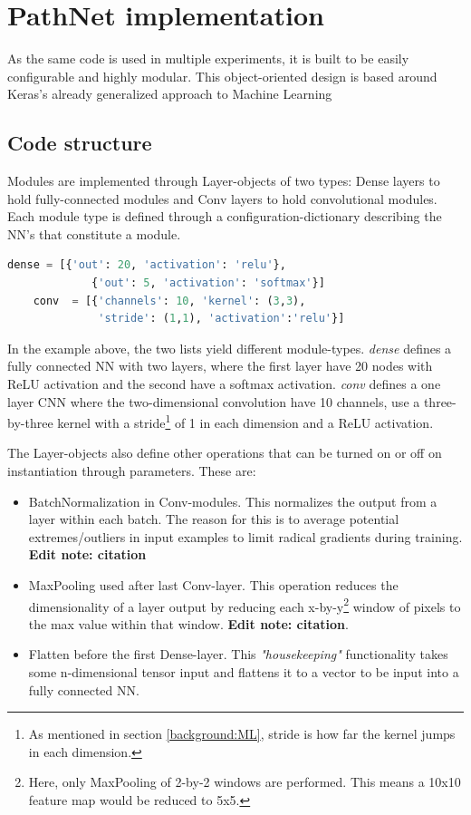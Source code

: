 \section{PathNet implementation}
As the same code is used in multiple experiments, it is built to be easily configurable and highly modular. This object-oriented design is based around Keras's already generalized approach to Machine Learning

\subsection{Code structure}
Modules are implemented through Layer-objects of two types: Dense layers to hold fully-connected modules and Conv layers to hold convolutional modules. Each module type is defined through a configuration-dictionary  describing the NN's that constitute a module. 

\begin{lstlisting}[language=Python]
    dense = [{'out': 20, 'activation': 'relu'}, 
             {'out': 5, 'activation': 'softmax'}]
    conv  = [{'channels': 10, 'kernel': (3,3), 
              'stride': (1,1), 'activation':'relu'}]
\end{lstlisting}
In the example above, the two lists yield different module-types. \textit{dense} defines a fully connected NN with two layers, where the first layer have 20 nodes with ReLU activation and the second have a softmax activation. \textit{conv} defines a one layer CNN where the two-dimensional convolution have 10 channels, use a three-by-three kernel with a stride\footnote{As mentioned in section \ref{background:ML}, stride is how far the kernel jumps in each dimension.} of 1 in each dimension and a ReLU activation.

The Layer-objects also define other operations that can be turned on or off on instantiation through parameters. These are:
\begin{itemize}
    \item BatchNormalization in Conv-modules. This normalizes the output from a layer within each batch. The reason for this is to average potential extremes/outliers in input examples to limit radical gradients during training. \textbf{Edit note: citation}
    \item MaxPooling used after last Conv-layer. This operation reduces the dimensionality of a layer output by reducing each x-by-y\footnote{Here, only MaxPooling of 2-by-2 windows are performed. This means a 10x10 feature map would be reduced to 5x5.} window of pixels to the max value within that window. \textbf{Edit note: citation}.
    \item Flatten before the first Dense-layer. This \textit{"housekeeping"} functionality takes some n-dimensional tensor input and flattens it to a vector to be input into a fully connected NN.  
\end{itemize}

